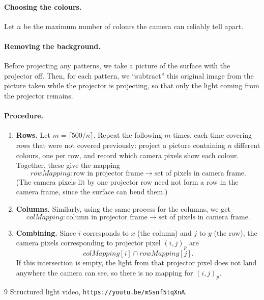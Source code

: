 \documentclass[11pt]{article}
\begin{document}
\paragraph{Choosing the colours.}
Let $n$ be the maximum number of colours the camera can reliably tell apart.

\paragraph{Removing the background.}
Before projecting any patterns, we take a picture of the surface with the projector off.
Then, for each pattern, we ``subtract'' this original image from the picture taken while
the projector is projecting, so that only the light coming from the projector remains.


\paragraph{Procedure.}
\begin{enumerate}
  \item \textbf{Rows.} Let $m = \lceil 500 / n \rceil$. Repeat the following $m$ times,
        each time covering rows that were not covered previously:
        project a picture containing $n$ different colours, one per row, and record which
        camera pixels show each colour. Together, these give the mapping
        \[
          \textit{rowMapping}: \text{row in projector frame} \to
          \text{set of pixels in camera frame}.
        \]
        (The camera pixels lit by one projector row need not form a row in the camera
        frame, since the surface can bend them.)
  \item \textbf{Columns.} Similarly, using the same process for the columns, we get
        \[
          \textit{colMapping}: \text{column in projector frame} \to
          \text{set of pixels in camera frame}.
        \]
  \item \textbf{Combining.} Since $i$ corresponds to $x$ (the column) and $j$ to $y$
        (the row), the camera pixels corresponding to projector pixel $(i, j)_p$ are
        \[
          \textit{colMapping}[i] \cap \textit{rowMapping}[j].
        \]
        If this intersection is empty, the light from that projector pixel does not land
        anywhere the camera can see, so there is no mapping for $(i, j)_p$.
\end{enumerate}

\begin{thebibliography}{9}
   Structured light video, \texttt{https://youtu.be/mSsnf5tqXnA}.
\end{thebibliography}
\end{document}
